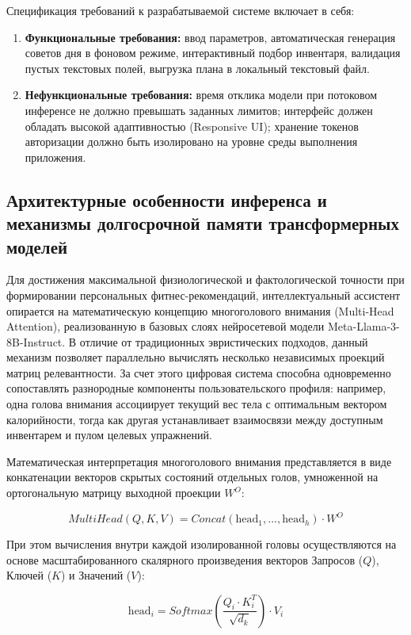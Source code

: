 \documentclass[14pt, a4paper]{extarticle}
\begin{document}
Спецификация требований к разрабатываемой системе включает в себя:
\begin{enumerate}
    \item \textbf{Функциональные требования:} ввод параметров, автоматическая генерация советов дня в фоновом режиме, интерактивный подбор инвентаря, валидация пустых текстовых полей, выгрузка плана в локальный текстовый файл.
    \item \textbf{Нефункциональные требования:} время отклика модели при потоковом инференсе не должно превышать заданных лимитов; интерфейс должен обладать высокой адаптивностью (Responsive UI); хранение токенов авторизации должно быть изолировано на уровне среды выполнения приложения.
\end{enumerate}
\subsection{Архитектурные особенности инференса и механизмы долгосрочной памяти трансформерных моделей}

Для достижения максимальной физиологической и фактологической точности при формировании персональных фитнес-рекомендаций, интеллектуальный ассистент опирается на математическую концепцию многоголового внимания (Multi-Head Attention), реализованную в базовых слоях нейросетевой модели Meta-Llama-3-8B-Instruct. В отличие от традиционных эвристических подходов, данный механизм позволяет параллельно вычислять несколько независимых проекций матриц релевантности. За счет этого цифровая система способна одновременно сопоставлять разнородные компоненты пользовательского профиля: например, одна голова внимания ассоциирует текущий вес тела с оптимальным вектором калорийности, тогда как другая устанавливает взаимосвязи между доступным инвентарем и пулом целевых упражнений.

Математическая интерпретация многоголового внимания представляется в виде конкатенации векторов скрытых состояний отдельных голов, умноженной на ортогональную матрицу выходной проекции $W^O$:

\begin{equation}\label{multihead}
MultiHead(Q, K, V) = Concat(\text{head}_1, \dots, \text{head}_h) \cdot W^O
\end{equation}

При этом вычисления внутри каждой изолированной головы осуществляются на основе масштабированного скалярного произведения векторов Запросов ($Q$), Ключей ($K$) и Значений ($V$):

\begin{equation}\label{head_i}
\text{head}_i = Softmax \left( \frac{Q_i \cdot K_i^T}{\sqrt{d_k}} \right) \cdot V_i
\end{equation}
\end{document}
